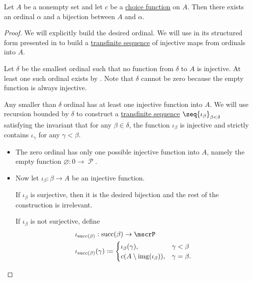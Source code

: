 \begin{lemma}\label{thm:ordinal_bijection_and_choice}
  Let \( A \) be a nonempty set and let \( c \) be a \hyperref[def:choice_function]{choice function} on \( A \). Then there exists an ordinal \( \alpha \) and a bijection between \( A \) and \( \alpha \).
\end{lemma}
\begin{proof}
  We will explicitly build the desired ordinal. We will use  in its structured form presented in  to build a \hyperref[def:transfinite_sequence]{transfinite sequence} of injective maps from ordinals into \( A \).

  Let \( \delta \) be the smallest ordinal such that no function from \( \delta \) to \( A \) is injective. At least one such ordinal exists by . Note that \( \delta \) cannot be zero because the empty function is always injective.

  Any smaller than \( \delta \) ordinal has at least one injective function into \( A \). We will use recursion bounded by \( \delta \) to construct a \hyperref[def:transfinite_sequence]{transfinite sequence} \( \seq{ \iota_\beta }_{\beta < \delta} \) satisfying the invariant that for any \( \beta \in \delta \), the function \( \iota_\beta \) is injective and strictly contains \( \iota_\gamma \) for any \( \gamma < \beta \).

  \begin{itemize}
    \item The zero ordinal has only one possible injective function into \( A \), namely the empty function \( \varnothing: 0 \to \mscrP \).

    \item Now let \( \iota_\beta: \beta \to A \) be an injective function.

    If \( \iota_\beta \) is surjective, then it is the desired bijection and the rest of the construction is irrelevant.

    If \( \iota_\beta \) is not surjective, define
    \begin{equation*}
      \begin{aligned}
        &\iota_{\op{succ}(\beta)}: \op{succ}(\beta) \to \mscrP \\
        &\iota_{\op{succ}(\beta)}(\gamma) \coloneqq \begin{cases}
          \iota_\beta(\gamma),         &\gamma < \beta \\
          c(A \setminus \img(\iota_\beta)), &\gamma = \beta.
        \end{cases}
      \end{aligned}
    \end{equation*}


\end{itemize}
\end{proof}
